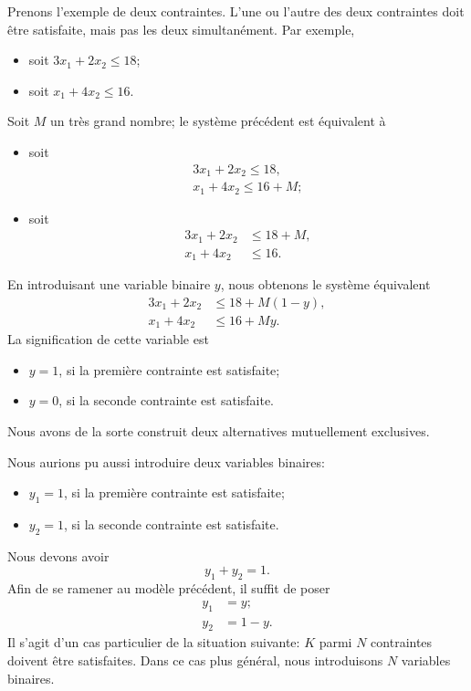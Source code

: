 Prenons l'exemple de deux contraintes.
L'une ou l'autre des deux contraintes doit être satisfaite, mais pas les deux simultanément. Par exemple,
\begin{itemize}
\item
soit $3x_1 + 2x_2 \leq 18$;
\item
soit $x_1 + 4x_2 \leq 16$.
\end{itemize}
Soit $M$ un très grand nombre; le système précédent est équivalent à
\begin{itemize}
\item
soit
\begin{align*}
3x_1 + 2x_2 \leq 18,\\
x_1 + 4x_2 \leq 16 + M;
\end{align*}
\item
soit
\begin{align*}
3x_1 + 2x_2 & \leq 18 + M,\\
x_1 + 4x_2 & \leq 16.
\end{align*}
\end{itemize}
En introduisant une variable binaire $y$, nous obtenons le système équivalent
\begin{align*}
3x_1 + 2x_2 &\leq 18 + M(1-y), \\
x_1 + 4x_2 &\leq 16 +My.
\end{align*}
La signification de cette variable est
\begin{itemize}
\item
$y = 1$, si la première contrainte est satisfaite;
\item
$y = 0$, si la seconde contrainte est satisfaite.
\end{itemize}
Nous avons de la sorte construit deux alternatives mutuellement exclusives.

Nous aurions pu aussi introduire deux variables binaires:
\begin{itemize}
\item
$y_1 = 1$, si la première contrainte est satisfaite;
\item
$y_2 = 1$, si la seconde contrainte est satisfaite.
\end{itemize}
Nous devons avoir
\[
y_1 + y_2 = 1.
\]
Afin de se ramener au modèle précédent, il suffit de poser
\begin{align*}
y_1 &= y; \\
y_2 &= 1-y.
\end{align*}
Il s'agit d'un cas particulier de la situation suivante: $K$ parmi $N$ contraintes doivent être satisfaites.
Dans ce cas plus général, nous introduisons $N$ variables binaires.

